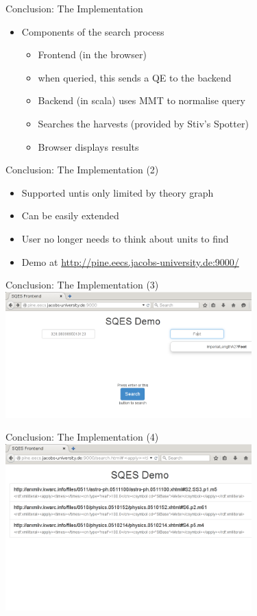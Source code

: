 \documentclass{beamer}
\begin{document}
  \begin{frame}{Conclusion: The Implementation}
    \begin{itemize}[<+->]
      \item Components of the search process
      \begin{itemize}
        \item Frontend (in the browser)
        \item when queried, this sends a QE to the backend
        \item Backend (in scala) uses MMT to normalise query
        \item Searches the harvests (provided by Stiv's Spotter)
        \item Browser displays results
      \end{itemize}
    \end{itemize}
  \end{frame}

  \begin{frame}{Conclusion: The Implementation (2)}
    \begin{itemize}[<+->]
      \item Supported untis only limited by theory graph
      \item Can be easily extended
      \item User no longer needs to think about units to find
      \item Demo at \url{http://pine.eecs.jacobs-university.de:9000/}
    \end{itemize}
  \end{frame}

  \begin{frame}{Conclusion: The Implementation (3)}
    \includegraphics[width=95mm]{imgs/screen1.png}
  \end{frame}

  \begin{frame}{Conclusion: The Implementation (4)}
    \includegraphics[width=95mm]{imgs/screen2.png}
  \end{frame}
\end{document}
